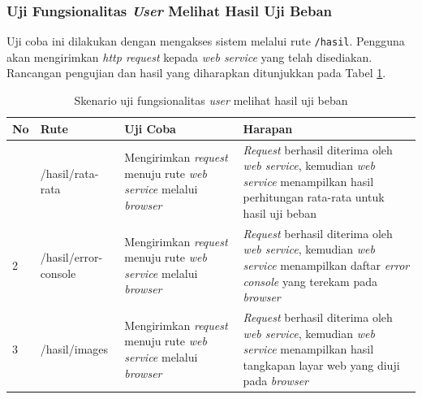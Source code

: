 		\subsubsection{Uji Fungsionalitas \textit{User} Melihat Hasil Uji Beban}
			Uji coba ini dilakukan dengan mengakses sistem melalui rute \texttt{/hasil}. Pengguna akan mengirimkan \textit{http request} kepada \textit{web service} yang telah disediakan. Rancangan pengujian dan hasil yang diharapkan ditunjukkan pada Tabel \ref{tabelujihasil}.
			\begin{longtable}{|p{}|p{}|p{0.30\textwidth}|p{}|}
				\caption{Skenario uji fungsionalitas \textit{user} melihat hasil uji beban} \label{tabelujihasil} \\ \hline
				\textbf{No} & \textbf{Rute} & \textbf{Uji Coba} & \textbf{Harapan} \\ \hline
				\endhead
				\endfoot
				\endlastfoot
				1 & /hasil/rata-rata & Mengirimkan \textit{request} menuju rute \textit{web service} melalui \textit{browser} & \textit{Request} berhasil diterima oleh \textit{web service}, kemudian \textit{web service} menampilkan hasil perhitungan rata-rata untuk hasil uji beban \\ \hline
				2 & /hasil/error-console & Mengirimkan \textit{request} menuju rute \textit{web service} melalui \textit{browser} & \textit{Request} berhasil diterima oleh \textit{web service}, kemudian \textit{web service} menampilkan daftar \textit{error console} yang terekam pada \textit{browser} \\ \hline
				3 & /hasil/images & Mengirimkan \textit{request} menuju rute \textit{web service} melalui \textit{browser} & \textit{Request} berhasil diterima oleh \textit{web service}, kemudian \textit{web service} menampilkan hasil tangkapan layar web yang diuji pada \textit{browser} \\ \hline
			\end{longtable}
		
